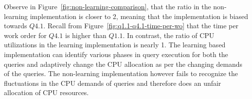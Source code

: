 Observe in Figure~\ref{fig:non-learning-comparison}, that the ratio in the non-learning implementation is closer to 2, meaning that the 
implementation is biased towards $Q4.1$. 
Recall from Figure~\ref{fig:q1.1-q4.1-time-per-wo} that the time per work order for $Q4.1$ is higher than $Q1.1$. 
In contrast, the ratio of CPU utilizations in the learning implementation is nearly 1.
The learning based implementation can identify various phases in query execution for 
both the queries and adaptively change the CPU allocation as per the changing demands 
of the queries.
The non-learning implementation however fails to recognize the fluctuations in the CPU 
demands of queries and therefore does an unfair allocation of CPU resources.
%
